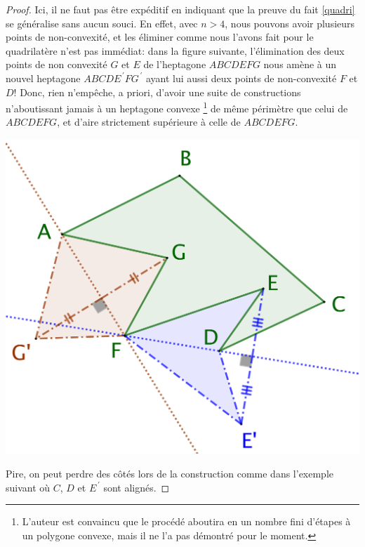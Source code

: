 \begin{proof}
	Ici, il ne faut pas être expéditif en indiquant que la preuve du fait \ref{quadri} se généralise sans aucun souci.
	En effet, avec $n > 4$, nous pouvons avoir plusieurs points de non-convexité, et les éliminer comme nous l'avons fait pour le quadrilatère n'est pas immédiat:
	dans la figure suivante, l'élimination des deux points de non convexité $G$ et $E$ de l'heptagone $ABCDEFG$ nous amène à un nouvel heptagone $ABCDE^{\,\prime}FG^{\,\prime}$ ayant lui aussi deux points de non-convexité $F$ et $D$!
	Donc, rien n'empêche, a priori, d'avoir une suite de constructions n'aboutissant jamais à un heptagone convexe%
	\footnote{
		L'auteur est convaincu que le procédé aboutira en un nombre fini d'étapes à un polygone convexe, mais il ne l'a pas démontré pour le moment.
	}
	de même périmètre que celui de $ABCDEFG$, et d'aire strictement supérieure à celle de $ABCDEFG$.

	\begin{center}
		\includegraphics[scale=.4]{content/polygon/polygon-non-convex-trap.png}
	\end{center}
	

	Pire, on peut perdre des côtés lors de la construction comme dans l'exemple suivant où $C$, $D$ et $E^{\,\prime}$ sont alignés.


\end{proof}
